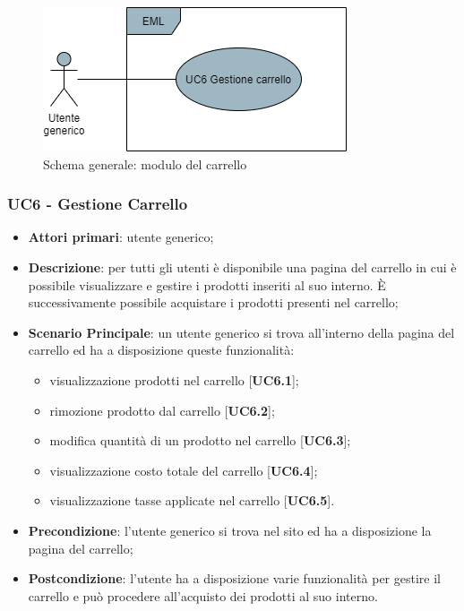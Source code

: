 \begin{figure}[H]
\centering
\includegraphics[scale=0.6]{res/UseCase/Immagini/CarrelloGenerale}
\caption{Schema generale: modulo del carrello}
\end{figure}

\subsubsection{UC6 - Gestione Carrello}
\begin{itemize}
\item \textbf{Attori primari}: utente generico;
\item \textbf{Descrizione}: per tutti gli utenti è disponibile una pagina del carrello in cui è possibile visualizzare e gestire i prodotti inseriti al suo interno. È successivamente possibile acquistare i prodotti presenti nel carrello;
\item \textbf{Scenario Principale}: un utente generico si trova all'interno della pagina del carrello ed ha a disposizione queste funzionalità:
\begin{itemize}
\item visualizzazione prodotti nel carrello [\textbf{UC6.1}];
\item rimozione prodotto dal carrello [\textbf{UC6.2}];
\item modifica quantità di un prodotto nel carrello [\textbf{UC6.3}];
\item visualizzazione costo totale del carrello [\textbf{UC6.4}];
\item visualizzazione tasse applicate nel carrello [\textbf{UC6.5}].
\end{itemize}
\item \textbf{Precondizione}: l'utente generico si trova nel sito ed ha a disposizione la pagina del carrello;
\item \textbf{Postcondizione}: l'utente ha a disposizione varie funzionalità per gestire il carrello e può procedere all'acquisto dei prodotti al suo interno.
\end{itemize}

